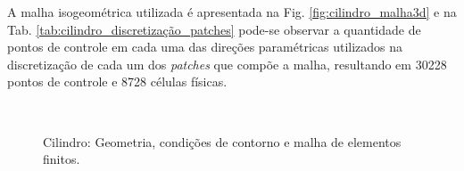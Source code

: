 \documentclass[tese_patricia]{subfiles}
\begin{document}
A malha isogeométrica utilizada é apresentada na Fig. \ref{fig:cilindro_malha3d} e na Tab. \ref{tab:cilindro_discretização_patches} pode-se observar a quantidade de pontos de controle em cada uma das direções paramétricas utilizados na discretização de cada um dos \textit{patches} que compõe a malha, resultando em 30228 pontos de controle e 8728 células físicas.


\begin{figure}[!htb]
	\centering
	\\
	\caption{Cilindro: Geometria, condições de contorno e malha de elementos finitos.}
\end{figure}
\end{document}

